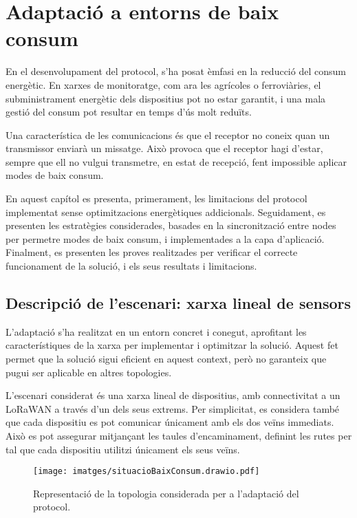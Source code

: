 \documentclass{tfgitic}[2024/07/01]
\begin{document}
{\chapter{Adaptació a entorns de baix consum}
\label{chap:adaptacio_baix_consum}
En el desenvolupament del protocol, s'ha posat èmfasi en la reducció del consum energètic. En xarxes de monitoratge, com ara les agrícoles o ferroviàries, el subministrament energètic dels dispositius pot no estar garantit, i una mala gestió del consum pot resultar en temps d'ús molt reduïts.

Una característica de les comunicacions és que el receptor no coneix quan un transmissor enviarà un missatge. Això provoca que el receptor hagi d'estar, sempre que ell no vulgui transmetre, en estat de recepció, fent impossible aplicar modes de baix consum.

En aquest capítol es presenta, primerament, les limitacions del protocol implementat sense optimitzacions energètiques addicionals. Seguidament, es presenten les estratègies considerades, basades en la sincronització entre nodes per permetre modes de baix consum, i implementades a la capa d'aplicació. Finalment, es presenten les proves realitzades per verificar el correcte funcionament de la solució, i els seus resultats i limitacions.

\section{Descripció de l’escenari: xarxa lineal de sensors}
L'adaptació s'ha realitzat en un entorn concret i conegut, aprofitant les característiques de la xarxa per implementar i optimitzar la solució. Aquest fet permet que la solució sigui eficient en aquest context, però no garanteix que pugui ser aplicable en altres topologies. 

L'escenari considerat és una xarxa lineal de dispositius, amb connectivitat a un  LoRaWAN a través d'un dels seus extrems. Per simplicitat, es considera també que cada dispositiu es pot comunicar únicament amb els dos veïns immediats. Això es pot assegurar mitjançant les taules d'encaminament, definint les rutes per tal que cada dispositiu utilitzi únicament els seus veïns. 

\begin{figure}
    \centering
    \texttt{[image: imatges/situacioBaixConsum.drawio.pdf]}
    \caption{Representació de la topologia considerada per a l'adaptació del protocol.}
    \label{fig:topologia_baix_consum}
\end{figure}

}
\end{document}
